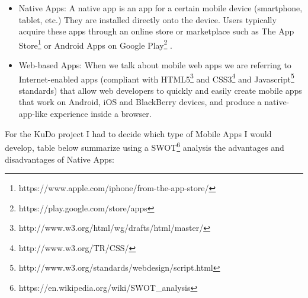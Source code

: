 \documentclass[a4paper,12pt]{book}
\begin{document}
\begin{itemize}
 \item Native Apps: A native app is an app for a certain mobile device (smartphone, tablet, etc.) They are installed directly onto the device. Users typically acquire these apps through an online store or marketplace such as The App Store\footnote{https://www.apple.com/iphone/from-the-app-store/} or Android Apps on Google Play\footnote{https://play.google.com/store/apps} .
 \item Web-based Apps: When we talk about mobile web apps we are referring to Internet-enabled apps (compliant with HTML5\footnote{http://www.w3.org/html/wg/drafts/html/master/} and CSS3\footnote{http://www.w3.org/TR/CSS/} and Javascript\footnote{http://www.w3.org/standards/webdesign/script.html}  standards) that allow web developers to quickly and easily create mobile apps that work on Android, iOS and BlackBerry devices, and produce a native-app-like experience inside a browser. 
\end{itemize}

For the KuDo project I had to decide which type of Mobile Apps I would develop, table below summarize using a SWOT\footnote{https://en.wikipedia.org/wiki/SWOT\_analysis} analysis the advantages and disadvantages of Native Apps:
\end{document}
